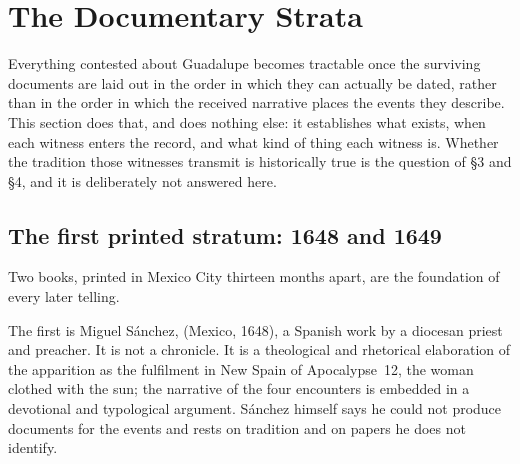 \sectionguard
\section{The Documentary Strata}

Everything contested about Guadalupe becomes tractable once the
surviving documents are laid out in the order in which they can
actually be dated, rather than in the order in which the received
narrative places the events they describe. This section does that,
and does nothing else: it establishes what exists, when each witness
enters the record, and what kind of thing each witness is. Whether
the tradition those witnesses transmit is historically true is the
question of \S3 and \S4, and it is deliberately not answered here.

\subsection{The first printed stratum: 1648 and 1649}

Two books, printed in Mexico City thirteen months apart, are the
foundation of every later telling.

The first is Miguel S\'anchez,  (Mexico, 1648), a Spanish work by a diocesan priest and
preacher. It is not a chronicle. It is a theological and rhetorical
elaboration of the apparition as the fulfilment in New Spain of
Apocalypse~12, the woman clothed with the sun; the narrative of the
four encounters is embedded in a devotional and typological argument.
S\'anchez himself says he could not produce documents for the events
and rests on tradition and on papers he does not
identify.

